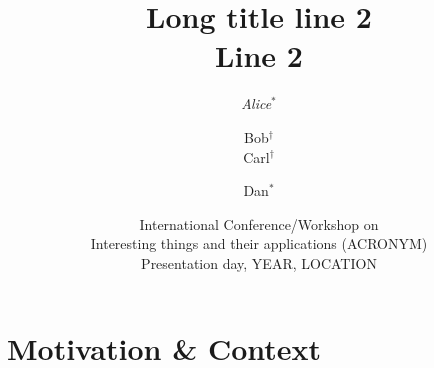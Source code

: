 \documentclass[presentation]{beamer}
\title[Short Title]{
    Long title line 2
    \\
    Line 2
}
\author[Alice et al.]{
	\emph{Alice}$^{*}$ %
	\and 
	Bob$^{\dagger}$
	\\
	Carl$^{\dagger}$
	\and
	Dan$^{*}$
}
\institute[UniBo, Uni*]{
    $^{*}$Dipartimento di Informatica -- Scienza e Ingegneria (DISI)
    \\
    \textsc{Alma Mater Studiorum} -- Università di Bologna
    \\
    \texttt{
        \{\emph{alice}, bob\}@unibo.it %
    }
    \vspace{.3cm}
    \\
    $^{\dagger}$University of Whatever
    \\
    \texttt{\{carl, dan\}@whatever.org}
}
\date[ACRONYM, YEAR]{
	International Conference/Workshop on
	\\
	Interesting things and their applications (ACRONYM)
	\\
	Presentation day, YEAR, LOCATION
}
\begin{document}

\frame{\titlepage}

\section{Motivation \& Context}
\end{document}
